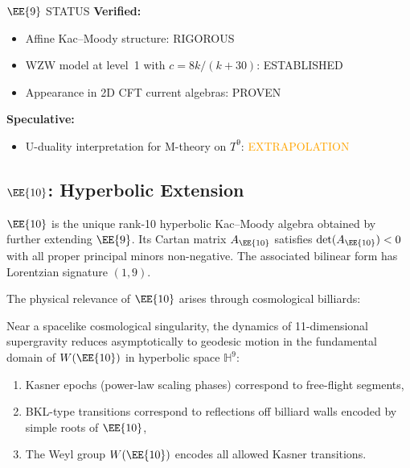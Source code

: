 \begin{factcheck}{$\EE{9}$ STATUS}
\textbf{Verified:}
\begin{itemize}
    \item Affine Kac--Moody structure: \textcolor{validcolor}{RIGOROUS}
    \item WZW model at level~1 with $c = 8k/(k+30)$:
          \textcolor{validcolor}{ESTABLISHED}
    \item Appearance in 2D CFT current algebras: \textcolor{validcolor}{PROVEN}
\end{itemize}

\textbf{Speculative:}
\begin{itemize}
    \item U-duality interpretation for M-theory on $T^9$:
          \textcolor{orange}{EXTRAPOLATION}
\end{itemize}
\end{factcheck}

\subsection{$\EE{10}$: Hyperbolic Extension}

\begin{definition}[$\EE{10}$]
\label{def:e10}
$\EE{10}$ is the unique rank-10 hyperbolic Kac--Moody algebra obtained by
further extending $\EE{9}$.  Its Cartan matrix $A_{\EE{10}}$ satisfies
$\det(A_{\EE{10}}) < 0$ with all proper principal minors non-negative.
The associated bilinear form has Lorentzian signature $(1,9)$.
\end{definition}

The physical relevance of $\EE{10}$ arises through cosmological billiards:

\begin{theorem}
\label{thm:cosmological_billiards}
Near a spacelike cosmological singularity, the dynamics of 11-dimensional
supergravity reduces asymptotically to geodesic motion in the fundamental
domain of $W(\EE{10})$ in hyperbolic space $\mathbb{H}^9$:
\begin{enumerate}
    \item Kasner epochs (power-law scaling phases) correspond to free-flight
          segments,
    \item BKL-type transitions correspond to reflections off billiard walls
          encoded by simple roots of $\EE{10}$,
    \item The Weyl group $W(\EE{10})$ encodes all allowed Kasner transitions.
\end{enumerate}
\end{theorem}


